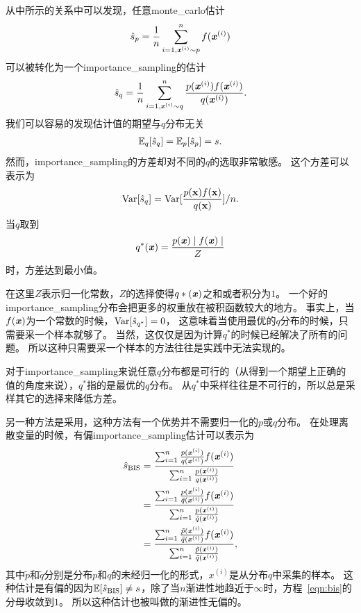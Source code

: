 从中所示的关系中可以发现，任意\gls{monte_carlo}估计
\begin{align}
\hat{s}_p = \frac{1}{n}\sum_{i=1,\boldsymbol{\mathit{x}}^{(i)}\sim p}^{n}f(\boldsymbol{\mathit{x}}^{(i)})
\end{align}
可以被转化为一个\gls{importance_sampling}的估计
\begin{align}
\hat{s}_q = \frac{1}{n}\sum_{i=1,\boldsymbol{\mathit{x}}^{(i)}\sim q}^{n}\frac{p(\boldsymbol{\mathit{x}}^{(i)})f(\boldsymbol{\mathit{x}}^{(i)})}{q(\boldsymbol{\mathit{x}}^{(i)})}.
\end{align}
我们可以容易的发现估计值的期望与$q$分布无关
\begin{align}
\mathbb{E}_q [\hat{s}_q] = \mathbb{E}_p [\hat{s}_p] = s.
\end{align}
然而，\gls{importance_sampling}的方差却对不同的$q$的选取非常敏感。
这个方差可以表示为
\begin{align}
\label{eqn:variance_of_is}
\text{Var} [\hat{s}_q] = \text{Var} [\frac{p(\mathbf{x})f(\mathbf{x})}{q(\mathbf{x})}]/n.
\end{align}
当$q$取到
\begin{align}
q^*(\boldsymbol{\mathit{x}}) = \frac{p(\boldsymbol{\mathit{x}})\mid f(\boldsymbol{\mathit{x}})\mid}{Z}
\end{align}
时，方差达到最小值。


在这里$Z$表示归一化常数，$Z$的选择使得$q*(\boldsymbol{\mathit{x}})$之和或者积分为$1$。
一个好的\gls{importance_sampling}分布会把更多的权重放在被积函数较大的地方。
事实上，当$f(\boldsymbol{\mathit{x}})$为一个常数的时候，$\text{Var}[\hat{s}_{q^*}]=0$， 这意味着当使用最优的$q$分布的时候，只需要采一个样本就够了。
当然，这仅仅是因为计算$q^*$的时候已经解决了所有的问题。
所以这种只需要采一个样本的方法往往是实践中无法实现的。

对于\gls{importance_sampling}来说任意$q$分布都是可行的（从得到一个期望上正确的值的角度来说），$q^*$指的是最优的$q$分布。
从$q^*$中采样往往是不可行的，所以总是采样其它的选择来降低方差。



另一种方法是采用，这种方法有一个优势并不需要归一化的$p$或$q$分布。
在处理离散变量的时候，有偏\gls{importance_sampling}估计可以表示为
\begin{align}
\label{eqn:bis}
\hat{s}_{\text{BIS}} & = \frac{\sum_{i=1}^{n} \frac{p(\boldsymbol{\mathit{x}}^{(i)})}{q(\boldsymbol{\mathit{x}}^{(i)})} f(\boldsymbol{\mathit{x}}^{(i)})}{\sum_{i=1}^{n}\frac{p(\boldsymbol{\mathit{x}}^{(i)})}{q(\boldsymbol{\mathit{x}}^{(i)})}} \\
& = \frac{\sum_{i=1}^{n} \frac{p(\boldsymbol{\mathit{x}}^{(i)})}{\tilde{q}(\boldsymbol{\mathit{x}}^{(i)})} f(\boldsymbol{\mathit{x}}^{(i)})}{\sum_{i=1}^{n}\frac{p(\boldsymbol{\mathit{x}}^{(i)})}{\tilde{q}(\boldsymbol{\mathit{x}}^{(i)})}} \\
& = \frac{\sum_{i=1}^{n} \frac{\tilde{p}(\boldsymbol{\mathit{x}}^{(i)})}{\tilde{q}(\boldsymbol{\mathit{x}}^{(i)})} f(\boldsymbol{\mathit{x}}^{(i)})}{\sum_{i=1}^{n}\frac{\tilde{p}(\boldsymbol{\mathit{x}}^{(i)})}{\tilde{q}(\boldsymbol{\mathit{x}}^{(i)})}},
\end{align}
其中$\tilde{p}$和$\tilde{q}$分别是分布${p}$和${q}$的未经归一化的形式，$x^{(i)}$是从分布${q}$中采集的样本。
这种估计是有偏的因为$\mathbb{E}[\hat{s}_{\text{BIS}}]\neq s$，除了当$n$渐进性地趋近于$\infty$时，方程~\eqref{eqn:bis}的分母收敛到$1$。
所以这种估计也被叫做的渐进性无偏的。

